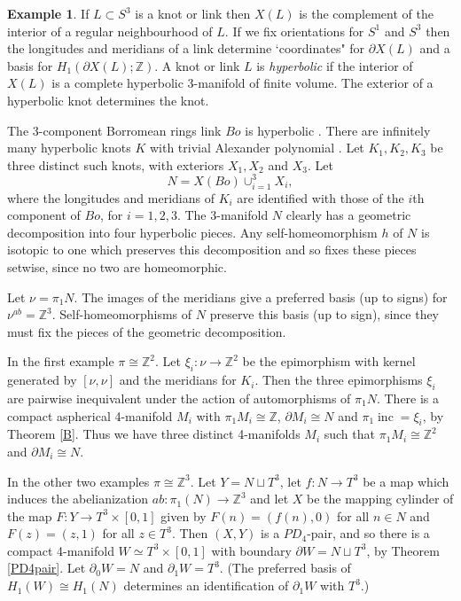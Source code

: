 \documentclass[12pt]{amsart}
\theoremstyle{definition}
\newtheorem{example}[theorem]{Example}
\newcommand{\Z}{\mathbb Z}
\DeclareMathOperator{\inc}{inc}
\begin{document}
\begin{example} \label{4d_he_with_homeo_b}
If $L\subset{S^3}$ is a knot or link then $X(L)$ is the complement 
of the interior of a regular neighbourhood of $L$.
If we fix orientations for $S^1$ and $S^3$ then 
the longitudes and meridians of a link 
determine `coordinates" for $\partial{X}(L)$ and
a basis for $H_1(\partial{X}(L);\mathbb{Z})$.
A knot or link $L$ is {\it hyperbolic\/} if the interior of $X(L)$ is a 
complete hyperbolic 3-manifold of finite volume.
The exterior of a hyperbolic knot determines the knot.

The 3-component Borromean rings link $Bo$ is hyperbolic 
\cite[pages 131-132]{Th}.
There are infinitely many hyperbolic knots $K$ with trivial Alexander 
polynomial \cite{Ka04}.
Let $K_1,K_2,K_3$ be three distinct such knots, 
with exteriors $X_1,X_2$ and $X_3$.
Let
\[N=X(Bo)\cup_{i=1}^3X_i,
\]
where the longitudes and meridians of $K_i$ are identified with
those of the $i$th component of $Bo$,  for $i=1,2,3$.
The 3-manifold $N$ clearly has a geometric decomposition
into four hyperbolic pieces.
Any self-homeomorphism $h$ of $N$ is isotopic to one which
preserves this decomposition and so fixes these pieces setwise, 
since no two are homeomorphic.

Let $\nu=\pi_1N$. 
The images of the meridians give a preferred basis (up to signs)
for $\nu^{ab}=\Z^3$.
Self-homeomorphisms of $N$ preserve this basis (up to sign), 
since they must fix the pieces of the geometric decomposition.

In the first example $\pi\cong\Z^2$.
Let $\xi_i:\nu\to\Z^2$ be the epimorphism with kernel generated by 
$[\nu,\nu]$ and the meridians for $K_i$.
Then the three epimorphisms $\xi_i$ are pairwise inequivalent under the action of 
automorphisms of $\pi_1N$.
There is a compact aspherical 4-manifold $M_i$ with $\pi_1M_i\cong\Z$,
$\partial{M_i}\cong{N}$ and $\pi_1\inc=\xi_i$,
by Theorem \ref{B}. 
Thus we have three distinct 4-manifolds $M_i$ such that $\pi_1M_i\cong\Z^2$
and  $\partial{M_i}\cong{N}$.

In the other two examples $\pi\cong\Z^3$.
Let $Y=N\sqcup{T^3}$, let $f:N\to{T^3}$ be a map which induces the abelianization 
$ab:\pi_1(N)\to\mathbb{Z}^3$ and let $X$ be the 
mapping cylinder of the map $F:Y\to{T^3}\times[0,1]$ given by 
$F(n)=(f(n),0)$ for all $n\in{N}$ and $F(z)=(z,1)$ for all $z\in{T^3}$.
Then $(X,Y)$ is a $PD_4$-pair,
and so there is a compact 4-manifold $W\simeq{T^3}\times[0,1]$ with boundary $\partial{W}=N\sqcup{T^3}$, 
by Theorem \ref{PD4pair}.
Let $\partial_0W=N$ and $\partial_1W=T^3$.
(The preferred basis of $H_1(W)\cong{H_1(N)}$
determines an identification of $\partial_1W$ with $T^3$.)


\end{example}
\end{document}
